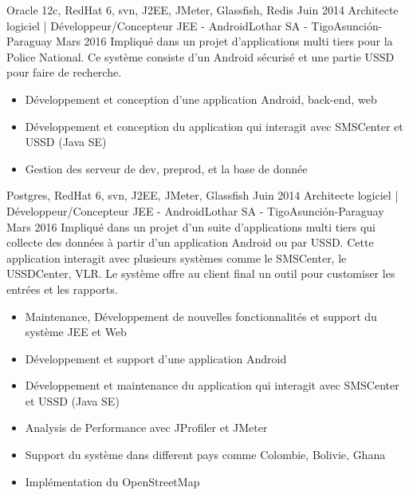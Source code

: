\begin{experiences}
{                 }
                 {Oracle 12c, RedHat 6, svn, J2EE, JMeter, Glassfish, Redis}
  \emptySeparator
  \projectexperiences
    {Juin 2014}  {Architecte logiciel | Développeur/Concepteur JEE - Android}{Lothar SA - Tigo}{Asunción-Paraguay}
    {Mars 2016}
                 {Impliqué dans un projet d'applications multi tiers pour la Police National. Ce système
                 consiste d'un Android sécurisé et une partie USSD pour faire de recherche.
                }
                 {
                      \begin{itemize}
                        \item Développement et conception d'une application Android, back-end, web
                        \item Développement et conception du application qui interagit avec SMSCenter et USSD (Java SE)
                        \item Gestion des serveur de dev, preprod, et la base de donnée
                      \end{itemize}
                 }
                 {Postgres, RedHat 6, svn, J2EE, JMeter, Glassfish}
  \emptySeparator
  \projectexperiences
    {Juin 2014}  {Architecte logiciel | Développeur/Concepteur JEE - Android}{Lothar SA - Tigo}{Asunción-Paraguay}
    {Mars 2016}
                 {Impliqué dans un projet d'un suite d'applications multi tiers qui collecte des données à partir
                 d'un application Android ou par USSD. Cette application interagit avec plusieurs systèmes comme
                 le SMSCenter, le USSDCenter, VLR. Le système offre au client final un outil pour customiser les
                 entrées et les rapports.
                  }
                 {
                      \begin{itemize}
                        \item Maintenance, Développement de nouvelles fonctionnalités et support du système JEE et Web
                        \item Développement et support d'une application Android
                        \item Développement et maintenance du application qui interagit avec SMSCenter et USSD (Java SE)
                        \item Analysis de Performance avec JProfiler et JMeter
                        \item Support du système dans different pays comme Colombie, Bolivie, Ghana
                        \item Implémentation du OpenStreetMap

\end{itemize}}
\end{experiences}
